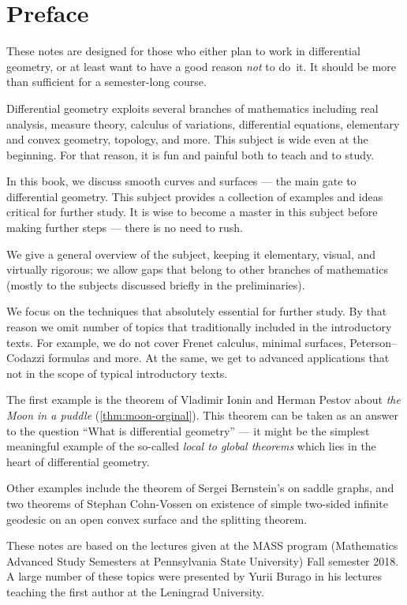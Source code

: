 
\chapter*{Preface}

These notes are designed for those who either plan to work in differential geometry,
or at least want to have a good reason \emph{not} to do~it.
It should be more than sufficient for a semester-long course. 

Differential geometry exploits several branches of mathematics including 
real analysis, 
measure theory,
calculus of variations,
differential equations,
elementary and convex geometry,
topology, and more.
This subject is wide even at the beginning. 
For that reason, it is fun and painful both to teach and to study.

In this book, we discuss smooth curves and surfaces --- the main gate to differential geometry.
This subject provides a collection of examples and ideas critical for further study.
It is wise to become a master in this subject before making further steps --- there is no need to rush.

We give a general overview of the subject, keeping it elementary, visual, and virtually rigorous; we allow gaps that belong to other branches of mathematics (mostly to the subjects discussed briefly in the preliminaries).

We focus on the techniques that absolutely essential for further study.
By that reason we omit number of topics that traditionally included in the introductory texts.
For example, we do not cover Frenet calculus, minimal surfaces, Peterson--Codazzi formulas and more.
At the same, we get to advanced applications
 that not in the scope of typical introductory texts.
 
The first example is the theorem of Vladimir Ionin and Herman Pestov about \emph{the Moon in a puddle} (\ref{thm:moon-orginal}).
This theorem can be taken as an answer to the question ``What is differential geometry'' --- 
it might be the simplest meaningful example of the so-called {}\emph{local to global theorems} which lies in the heart of differential geometry.

Other examples include the theorem of Sergei Bernstein's on saddle graphs, and two theorems of Stephan Cohn-Vossen on existence of simple two-sided infinite geodesic on an open convex surface and the splitting theorem.

These notes are based on the lectures given at the MASS program (Mathematics Advanced Study Semesters at Pennsylvania State University) Fall semester 2018.
A large number of these topics were presented by Yurii Burago in his lectures teaching the first author at the Leningrad University.

